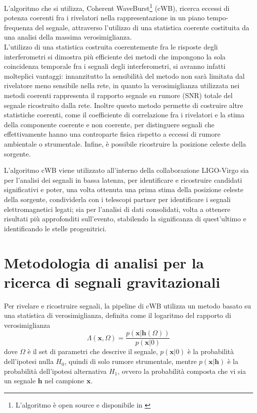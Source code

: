 L'algoritmo che si utilizza, Coherent WaveBurst\footnote{L'algoritmo è open source e disponibile in \cite{cWB}} (cWB), ricerca eccessi di potenza coerenti fra i rivelatori nella rappresentazione in un piano tempo-frequenza del segnale, attraverso l'utilizzo di una statistica coerente costituita da una analisi della massima verosimiglianza.\\
L'utilizzo di una statistica costruita coerentemente fra le risposte degli interferometri si dimostra più efficiente dei metodi che impongono la sola coincidenza temporale fra i segnali degli interferometri, si avranno infatti molteplici vantaggi: innanzitutto la sensibilità del metodo non sarà limitata dal rivelatore meno sensibile nella rete, in quanto la verosimiglianza utilizzata nei metodi coerenti rappresenta il rapporto segnale su rumore (SNR) totale del segnale ricostruito dalla rete. 
Inoltre questo metodo permette di costruire altre statistiche coerenti, come il coefficiente di correlazione fra i rivelatori e la stima della componente coerente e non coerente, per distinguere segnali che effettivamente hanno una controparte fisica rispetto a eccessi di rumore ambientale o strumentale. Infine, è possibile ricostruire la posizione celeste della sorgente\cite{Klimenko_2008}.

L'algoritmo cWB viene utilizzato all'interno della collaborazione LIGO-Virgo sia per l'analisi dei segnali in bassa latenza, per identificare e ricostruire candidati significativi e poter, una volta ottenuta una prima stima della posizione celeste della sorgente, condividerla con i telescopi partner per identificare i segnali elettromagnetici legati; sia per l'analisi di dati consolidati, volta a ottenere risultati più approfonditi sull'evento, stabilendo la significanza di quest'ultimo e identificando le stelle progenitrici\cite{Klimenko_2016}.
\section{Metodologia di analisi per la ricerca di segnali gravitazionali}
\label{section:coherent_analysis}
Per rivelare e ricostruire segnali, la pipeline di cWB utilizza un metodo basato su una statistica di verosimiglianza, definita come il logaritmo del rapporto di verosimiglianza
\begin{equation}
	\Lambda(\mathbf{x},\Omega) = \frac{p(\mathbf{x}|\mathbf{h}(\Omega))}{p(\mathbf{x}|0)}
\end{equation}
dove $\Omega$ è il set di parametri che descrive il segnale, $p(\mathbf{x}|0)$ è la probabilità dell'ipotesi nulla $H_0$, quindi di solo rumore strumentale, mentre $p(\mathbf{x}|\mathbf{h})$ è la probabilità dell'ipotesi alternativa $H_1$, ovvero la probabilità composta che vi sia un segnale $\mathbf{h}$ nel campione $\mathbf{x}$\cite{Klimenko_2016}.


